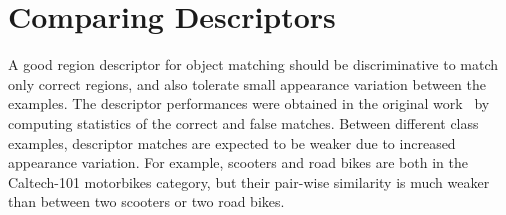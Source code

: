 \documentclass[review]{elsarticle}
\begin{document}
%
\section{Comparing Descriptors\label{sec:descriptorcomparison}}
%
A good region descriptor for object matching should be
discriminative to match only correct regions, and also tolerate
small appearance variation between the examples.
The descriptor performances were obtained in the original
work~\cite{MikSch:2005} by computing statistics of the correct and false
matches. Between different class examples, descriptor matches are expected to
be weaker due to increased appearance variation.
For example, scooters and road bikes are both in the
Caltech-101 motorbikes category, but their pair-wise similarity
is much weaker than between two scooters or two road bikes.




\end{document}
